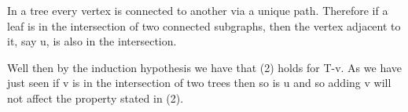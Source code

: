 \documentclass{article}
\begin{document}
	In a tree every vertex is connected to another via a unique path. Therefore if a leaf is in the intersection of two connected subgraphs, then the vertex adjacent to it, say u, is also in the intersection. 
	
	Well then by the induction hypothesis we have that (2) holds for T-v.  As we have just seen if v is in the intersection of two trees then so is u and so adding v will not affect the property stated in (2).
	
	
	
	
	
	
\end{document}
